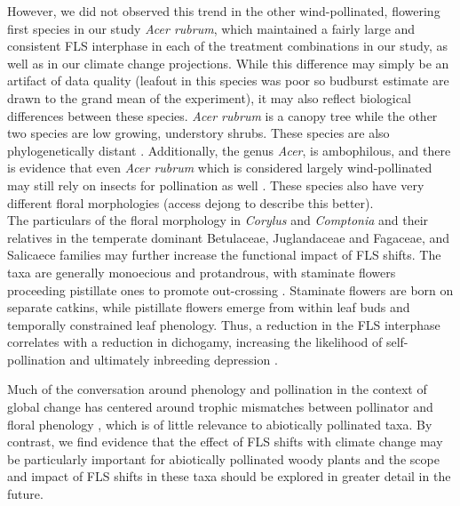 \documentclass[11pt]{article}
\begin{document}
\noindent However, we did not observed this trend in the other wind-pollinated, flowering first species in our study \textit{Acer rubrum}, which maintained a fairly large and consistent FLS interphase in each of the treatment combinations in our study, as well as in our climate change projections. While this difference may simply be an artifact of data quality (leafout in this species was poor so budburst estimate are drawn to the grand mean of the experiment), it may also reflect biological differences between these species. \textit{Acer rubrum} is a canopy tree while the other two species are low growing, understory shrubs. These species are also phylogenetically distant \citep{}. Additionally, the genus \textit{Acer}, is ambophilous\citep{Dejung_1972}, and there is evidence that even \textit{Acer rubrum} which is considered largely wind-pollinated may still rely on insects for pollination as well \citep{}. These species also have very different floral morphologies (access dejong to describe this better).\\

\noindent The particulars of the floral morphology in \textit{Corylus} and \textit{Comptonia} and their relatives in the temperate dominant Betulaceae, Juglandaceae and Fagaceae, and Salicaece families may further increase the functional impact of FLS shifts. The taxa are generally monoecious and protandrous, with staminate flowers proceeding pistillate ones to promote out-crossing \citep{}.  Staminate flowers are born on separate catkins, while pistillate flowers emerge from within leaf buds and temporally constrained leaf phenology. Thus, a reduction in the FLS interphase correlates with a reduction in dichogamy, increasing the likelihood of self-pollination and ultimately inbreeding depression \citep{}.

\noindent Much of the conversation around phenology and pollination in the context of global change has centered around trophic mismatches between pollinator and floral phenology \citep{}, which is of little relevance to abiotically pollinated taxa. By contrast, we find evidence that the effect of FLS shifts with climate change may be particularly important for abiotically pollinated woody plants and the scope and impact of FLS shifts in these taxa should be explored in greater detail in the future.\\
\end{document}
